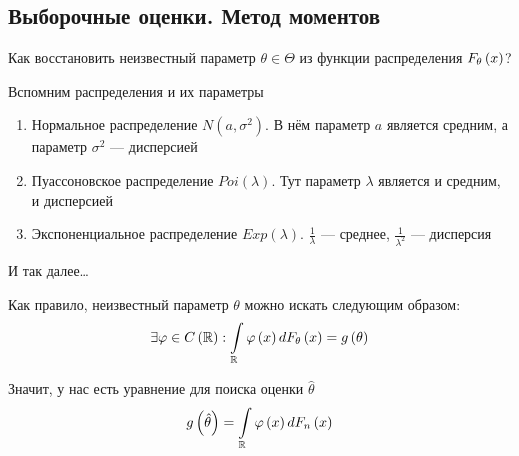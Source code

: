 \subsection{Выборочные оценки. Метод моментов}
Как восстановить неизвестный параметр $\theta\in\Theta$
из функции распределения $F_{\theta}\left(x\right)$?

Вспомним распределения и их параметры
\begin{enumerate}
    \item Нормальное распределение $N\left(a,\sigma^2\right)$.
        В нём параметр $a$ является средним,
        а параметр $\sigma^2$ --- дисперсией
    \item Пуассоновское распределение $Poi\left(\lambda\right)$.
        Тут параметр $\lambda$ является и средним, и дисперсией
    \item Экспоненциальное распределение $Exp\left(\lambda\right)$.
        $\frac{1}{\lambda}$ --- среднее,
        $\frac{1}{\lambda^2}$ --- дисперсия
\end{enumerate}
И так далее\ldots

Как правило, неизвестный параметр $\theta$ можно искать следующим образом:
$$\exists\varphi\in C\left(\mathbb{R}\right):
    \int\limits_{\mathbb{R}}\varphi\left(x\right)dF_{\theta}\left(x\right)
        =g\left(\theta\right)$$

Значит, у нас есть уравнение для поиска оценки $\hat{\theta}$
\begin{equation}\label{eq:unknown_parameter}
g\left(\hat{\theta}\right)
    =\int\limits_{\mathbb{R}}\varphi\left(x\right)dF_n\left(x\right)
\end{equation}

